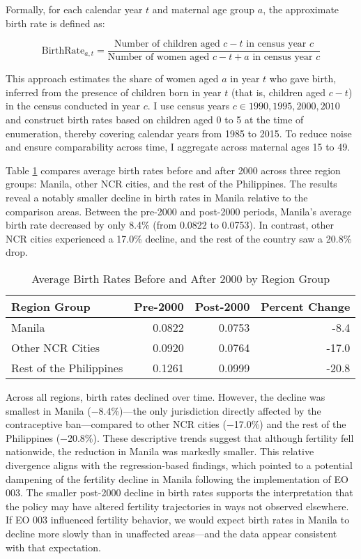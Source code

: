 \documentclass[]{AEA}
\begin{document}
Formally, for each calendar year \(t\) and maternal age group \(a\), the
approximate birth rate is defined as:

\[
\text{BirthRate}_{a,t} =
\frac{
  \text{Number of children aged } c - t \text{ in census year } c
}{
  \text{Number of women aged } c - t + a \text{ in census year } c
}
\]

This approach estimates the share of women aged \(a\) in year \(t\) who
gave birth, inferred from the presence of children born in year \(t\)
(that is, children aged \(c - t\)) in the census conducted in year
\(c\). I use census years \(c \in {1990, 1995, 2000, 2010}\) and
construct birth rates based on children aged 0 to 5 at the time of
enumeration, thereby covering calendar years from 1985 to 2015. To
reduce noise and ensure comparability across time, I aggregate across
maternal ages 15 to 49.

Table \ref{tab:birthrates-region} compares average birth rates before
and after 2000 across three region groups: Manila, other NCR cities, and
the rest of the Philippines. The results reveal a notably smaller
decline in birth rates in Manila relative to the comparison areas.
Between the pre-2000 and post-2000 periods, Manila's average birth rate
decreased by only 8.4\% (from 0.0822 to 0.0753). In contrast, other NCR
cities experienced a 17.0\% decline, and the rest of the country saw a
20.8\% drop.

\begin{table}[!h]
\centering
\caption{\label{tab:birthrates-region}Average Birth Rates Before and After 2000 by Region Group}
\centering
\begin{tabular}[t]{lrrr}
\toprule
Region Group & Pre-2000 & Post-2000 & Percent Change\\
\midrule
Manila & 0.0822 & 0.0753 & -8.4\\
Other NCR Cities & 0.0920 & 0.0764 & -17.0\\
Rest of the Philippines & 0.1261 & 0.0999 & -20.8\\
\bottomrule
\end{tabular}
\end{table}

Across all regions, birth rates declined over time. However, the decline
was smallest in Manila (−8.4\%)---the only jurisdiction directly
affected by the contraceptive ban---compared to other NCR cities
(−17.0\%) and the rest of the Philippines (−20.8\%). These descriptive
trends suggest that although fertility fell nationwide, the reduction in
Manila was markedly smaller. This relative divergence aligns with the
regression-based findings, which pointed to a potential dampening of the
fertility decline in Manila following the implementation of EO 003. The
smaller post-2000 decline in birth rates supports the interpretation
that the policy may have altered fertility trajectories in ways not
observed elsewhere. If EO 003 influenced fertility behavior, we would
expect birth rates in Manila to decline more slowly than in unaffected
areas---and the data appear consistent with that expectation.
\end{document}
